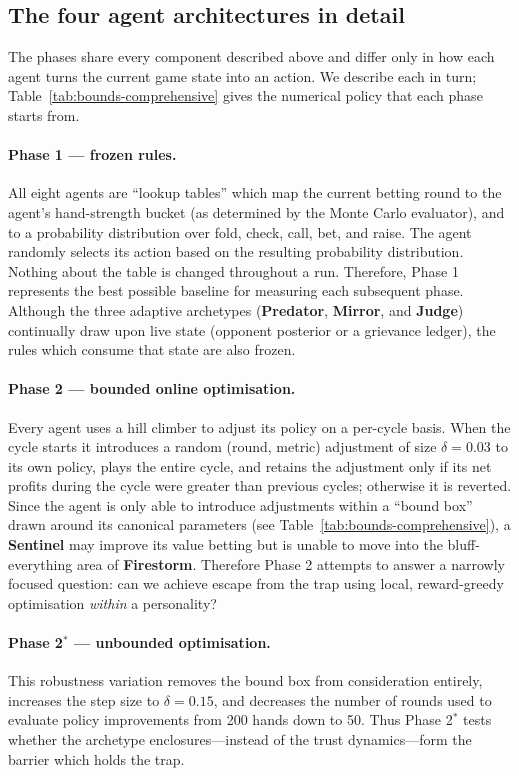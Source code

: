 \documentclass[10pt]{article} %
\newcommand{\arch}[1]{\textbf{#1}}
\begin{document}
\subsection{The four agent architectures in detail}
The phases share every component described above and differ only in
how each agent turns the current game state into an action. We
describe each in turn; Table~\ref{tab:bounds-comprehensive} gives the
numerical policy that each phase starts from.

\paragraph{Phase 1 --- frozen rules.} All eight agents are ``lookup tables'' which map the current betting
round to the agent's hand-strength bucket (as determined by the Monte Carlo
evaluator), and to a probability distribution over fold, check, call, bet, and
raise. The agent randomly selects its action based on the resulting probability
distribution. Nothing about the table is changed throughout a run. Therefore,
Phase 1 represents the best possible baseline for measuring each subsequent
phase. Although the three adaptive archetypes (\arch{Predator}, \arch{Mirror},
and \arch{Judge}) continually draw upon live state (opponent posterior or a
grievance ledger), the rules which consume that state are also frozen.

\paragraph{Phase 2 --- bounded online optimisation.} Every agent uses a hill climber to adjust its policy on a per-cycle basis.
When the cycle starts it introduces a random (round, metric) adjustment of size
$\delta = 0.03$ to its own policy, plays the entire cycle, and retains the
adjustment only if its net profits during the cycle were greater than previous
cycles; otherwise it is reverted. Since the agent is only able to introduce
adjustments within a ``bound box'' drawn around its canonical parameters (see
Table~\ref{tab:bounds-comprehensive}), a \arch{Sentinel} may improve its
value betting but is unable to move into the bluff-everything area of
\arch{Firestorm}. Therefore Phase 2 attempts to answer a narrowly focused
question: can we achieve escape from the trap using local, reward-greedy
optimisation \emph{within} a personality?

\paragraph{Phase 2$^{*}$ --- unbounded optimisation.} This robustness variation removes the bound box from consideration entirely,
increases the step size to $\delta = 0.15$, and decreases the number of rounds
used to evaluate policy improvements from 200 hands down to 50. Thus
Phase 2$^{*}$ tests whether the archetype enclosures---instead of the trust
dynamics---form the barrier which holds the trap.
\end{document}
